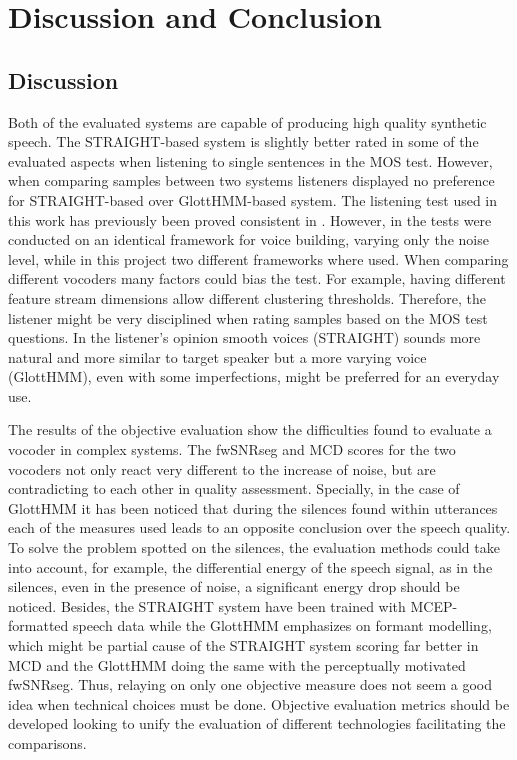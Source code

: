 \section{Discussion and Conclusion}
\label{conclusions}

\subsection{Discussion}
\label{conclusions_discussion}
Both of the evaluated systems are capable of producing high quality synthetic speech.
%
The STRAIGHT-based system is slightly better rated  in some of the evaluated aspects when listening to single sentences in the MOS test.
%
However, when comparing samples between two systems listeners displayed no preference for STRAIGHT-based over GlottHMM-based system.
%
The listening test used in this work has previously been proved consistent in \cite{karhila_jstsp_14}.
%
However, in \cite{karhila_jstsp_14} the tests were conducted on an identical framework for voice building, varying only the noise level, while in this project two different frameworks where used.
%
When comparing different vocoders many factors could bias the test. For example, having different feature stream dimensions allow different clustering thresholds.
%
Therefore, the listener might be very disciplined when rating samples based on the MOS test questions.
%
In the listener's opinion smooth voices (STRAIGHT) sounds more natural and more similar to target speaker but a more varying voice (GlottHMM), even with some imperfections, might be preferred for an everyday use.

The results of the objective evaluation show the difficulties found to evaluate a vocoder in complex systems.
%
The fwSNRseg and MCD scores for the two vocoders not only react very different to the increase of noise, but are contradicting to each other in quality assessment.
%
Specially, in the case of GlottHMM it has been noticed that during the silences found within utterances each of the measures used leads to an opposite conclusion over the speech quality.
%
To solve the problem spotted on the silences, the evaluation methods could take into account, for example, the differential energy of the speech signal, as in the silences, even in the presence of noise, a significant energy drop should be noticed.
%
Besides, the STRAIGHT system have been trained with MCEP-formatted speech data while the GlottHMM emphasizes on formant modelling, which might be partial cause of the STRAIGHT system scoring far better in MCD and the GlottHMM doing the same with the perceptually motivated fwSNRseg.
%
Thus, relaying on only one objective measure does not seem a good idea when technical choices must be done.
%
Objective evaluation metrics should be developed looking to unify the evaluation of different technologies facilitating the comparisons.

